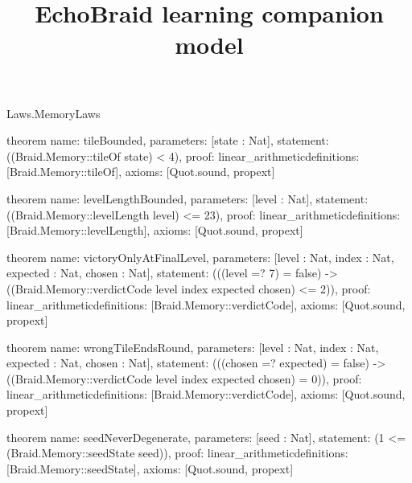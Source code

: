 \begin{lexlean}{Laws.MemoryLaws}
\title{EchoBraid learning companion model}
\begin{semanticmodule}
theorem{
  name: tileBounded,
  parameters: [state : Nat],
  statement: ((Braid.Memory::tileOf state) < 4),
  proof: linear_arithmetic{definitions: [Braid.Memory::tileOf]},
  axioms: [Quot.sound, propext]
}

theorem{
  name: levelLengthBounded,
  parameters: [level : Nat],
  statement: ((Braid.Memory::levelLength level) <= 23),
  proof: linear_arithmetic{definitions: [Braid.Memory::levelLength]},
  axioms: [Quot.sound, propext]
}

theorem{
  name: victoryOnlyAtFinalLevel,
  parameters: [level : Nat, index : Nat, expected : Nat, chosen : Nat],
  statement: (((level =? 7) = false) -> ((Braid.Memory::verdictCode level index expected chosen) <= 2)),
  proof: linear_arithmetic{definitions: [Braid.Memory::verdictCode]},
  axioms: [Quot.sound, propext]
}

theorem{
  name: wrongTileEndsRound,
  parameters: [level : Nat, index : Nat, expected : Nat, chosen : Nat],
  statement: (((chosen =? expected) = false) -> ((Braid.Memory::verdictCode level index expected chosen) = 0)),
  proof: linear_arithmetic{definitions: [Braid.Memory::verdictCode]},
  axioms: [Quot.sound, propext]
}

theorem{
  name: seedNeverDegenerate,
  parameters: [seed : Nat],
  statement: (1 <= (Braid.Memory::seedState seed)),
  proof: linear_arithmetic{definitions: [Braid.Memory::seedState]},
  axioms: [Quot.sound, propext]
}
\end{semanticmodule}
\end{lexlean}
